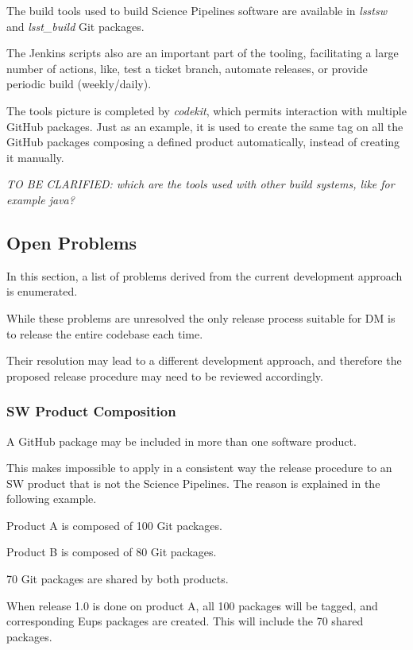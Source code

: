 The build tools used to build Science Pipelines software are available in \textit{lsstsw} and \textit{lsst\_build} Git packages.

The Jenkins scripts also are an important part of the tooling, facilitating a large number of actions, like, test a ticket branch, automate releases, or provide periodic build (weekly/daily).

The tools picture is completed by \textit{codekit}, which permits interaction with multiple GitHub packages.
Just as an example, it is used to create the same tag on all the GitHub packages composing a defined product automatically, instead of creating it manually.

\textit{TO BE CLARIFIED: which are the tools used with other build systems, like for example java?}


\subsection{Open Problems} \label{sec:openProblems}

In this section, a list of problems derived from the current development approach is enumerated. 

While these problems are unresolved the only release process suitable for DM is to release the entire codebase each time.

Their resolution may lead to a different development approach, and therefore the proposed release procedure may need to be reviewed accordingly.


\subsubsection{SW Product Composition} \label{sec:problemId}

A GitHub package may be included in more than one software product.

This makes impossible to apply in a consistent way the release procedure to an SW product that is not the Science Pipelines.
The reason is explained in the following example.

Product A is composed of 100 Git packages.

Product B is composed of 80 Git packages.

70 Git packages are shared by both products.

When release 1.0 is done on product A, all 100 packages will be tagged, and corresponding Eups packages are created. This will include the 70 shared packages.


